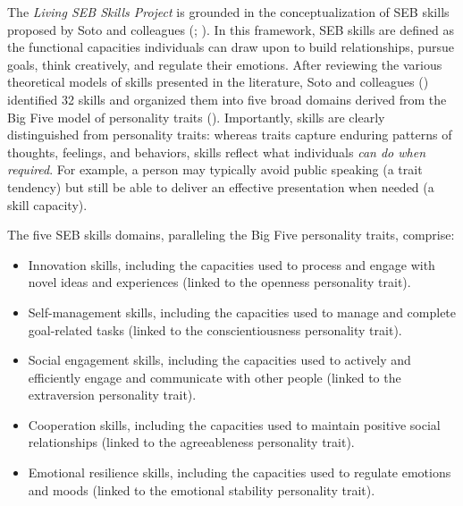 \documentclass[
  man,
  longtable,
  nolmodern,
  notxfonts,
  notimes,
  colorlinks=true,linkcolor=blue,citecolor=blue,urlcolor=blue]{apa7}
\begin{document}
The \emph{Living SEB Skills Project} is grounded in the
conceptualization of SEB skills proposed by Soto and colleagues
(;
). In
this framework, SEB skills are defined as the functional capacities
individuals can draw upon to build relationships, pursue goals, think
creatively, and regulate their emotions. After reviewing the various
theoretical models of skills presented in the literature, Soto and
colleagues
()
identified 32 skills and organized them into five broad domains derived
from the Big Five model of personality traits
(). Importantly, skills
are clearly distinguished from personality traits: whereas traits
capture enduring patterns of thoughts, feelings, and behaviors, skills
reflect what individuals \emph{can do when required}. For example, a
person may typically avoid public speaking (a trait tendency) but still
be able to deliver an effective presentation when needed (a skill
capacity).

The five SEB skills domains, paralleling the Big Five personality
traits, comprise:

\begin{itemize}
\item
  Innovation skills, including the capacities used to process and engage
  with novel ideas and experiences (linked to the openness personality
  trait).
\item
  Self-management skills, including the capacities used to manage and
  complete goal-related tasks (linked to the conscientiousness
  personality trait).
\item
  Social engagement skills, including the capacities used to actively
  and efficiently engage and communicate with other people (linked to
  the extraversion personality trait).
\item
  Cooperation skills, including the capacities used to maintain positive
  social relationships (linked to the agreeableness personality trait).
\item
  Emotional resilience skills, including the capacities used to regulate
  emotions and moods (linked to the emotional stability personality
  trait).
\end{itemize}
\end{document}
